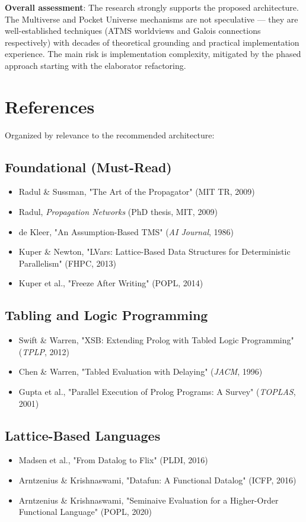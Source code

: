 \documentclass[11pt]{article}
\begin{document}
\textbf{Overall assessment}: The research strongly supports the proposed
architecture. The Multiverse and Pocket Universe mechanisms are not
speculative --- they are well-established techniques (ATMS worldviews
and Galois connections respectively) with decades of theoretical
grounding and practical implementation experience. The main risk is
implementation complexity, mitigated by the phased approach starting
with the elaborator refactoring.
\section{References}
\label{sec:org7622514}

Organized by relevance to the recommended architecture:
\subsection{Foundational (Must-Read)}
\label{sec:org7278eb0}
\begin{itemize}
\item Radul \& Sussman, "The Art of the Propagator" (MIT TR, 2009)
\item Radul, \emph{Propagation Networks} (PhD thesis, MIT, 2009)
\item de Kleer, "An Assumption-Based TMS" (\emph{AI Journal}, 1986)
\item Kuper \& Newton, "LVars: Lattice-Based Data Structures for Deterministic Parallelism" (FHPC, 2013)
\item Kuper et al., "Freeze After Writing" (POPL, 2014)
\end{itemize}
\subsection{Tabling and Logic Programming}
\label{sec:orga7795f7}
\begin{itemize}
\item Swift \& Warren, "XSB: Extending Prolog with Tabled Logic Programming" (\emph{TPLP}, 2012)
\item Chen \& Warren, "Tabled Evaluation with Delaying" (\emph{JACM}, 1996)
\item Gupta et al., "Parallel Execution of Prolog Programs: A Survey" (\emph{TOPLAS}, 2001)
\end{itemize}
\subsection{Lattice-Based Languages}
\label{sec:org53c296e}
\begin{itemize}
\item Madsen et al., "From Datalog to Flix" (PLDI, 2016)
\item Arntzenius \& Krishnaswami, "Datafun: A Functional Datalog" (ICFP, 2016)
\item Arntzenius \& Krishnaswami, "Seminaive Evaluation for a Higher-Order Functional Language" (POPL, 2020)
\end{itemize}
\end{document}
